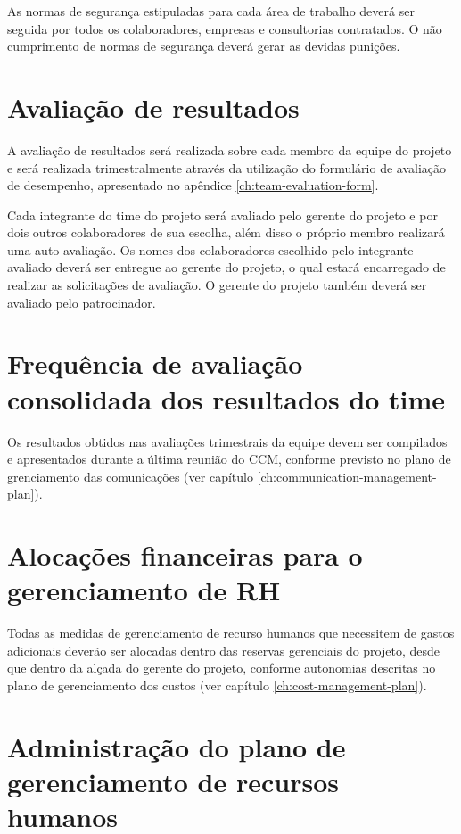 As normas de segurança estipuladas para cada área de trabalho deverá ser seguida por todos os colaboradores, empresas e consultorias contratados. O não cumprimento de normas de segurança deverá gerar as devidas punições.

\section{Avaliação de resultados}

A avaliação de resultados será realizada sobre cada membro da equipe do projeto e será realizada trimestralmente através da utilização do formulário de avaliação de desempenho, apresentado no apêndice \ref{ch:team-evaluation-form}.

Cada integrante do time do projeto será avaliado pelo gerente do projeto e por dois outros colaboradores de sua escolha, além disso o próprio membro realizará uma auto-avaliação. Os nomes dos colaboradores escolhido pelo integrante avaliado deverá ser entregue ao gerente do projeto, o qual estará encarregado de realizar as solicitações de avaliação. O gerente do projeto também deverá ser avaliado pelo patrocinador.

\section{Frequência de avaliação consolidada dos resultados do time}

Os resultados obtidos nas avaliações trimestrais da equipe devem ser compilados e apresentados durante a última reunião do CCM, conforme previsto no plano de grenciamento das comunicações (ver capítulo \ref{ch:communication-management-plan}).

\section{Alocações financeiras para o gerenciamento de RH}

Todas as medidas de gerenciamento de recurso humanos que necessitem de gastos adicionais deverão ser alocadas dentro das reservas gerenciais do projeto, desde que dentro da alçada do gerente do projeto, conforme autonomias descritas no plano de gerenciamento dos custos (ver capítulo \ref{ch:cost-management-plan}). 

\section{Administração do plano de gerenciamento de recursos humanos}

